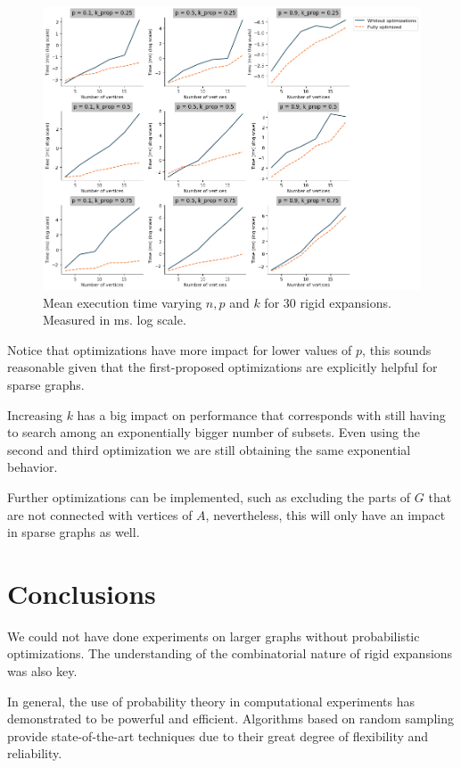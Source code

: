 \begin{figure}[h!]
	\centering
	\includegraphics[scale=0.45]{Python/Figures/Time-execution-rigid-expansions-log-scale.png}
	\caption{Mean execution time varying $n, p$ and $k$ for 30 rigid expansions. Measured in ms. log scale.}
	\label{fig:executionTimesRigidExpansionLog}
\end{figure}

Notice that optimizations have more impact for lower values of $p$, this sounds reasonable given that the first-proposed optimizations are explicitly helpful for sparse graphs. 

Increasing $k$ has a big impact on performance that corresponds with still having to search among an exponentially bigger number of subsets. Even using the second and third optimization we are still obtaining the same exponential behavior.

Further optimizations can be implemented, such as excluding the parts of $G$ that are not connected with vertices of $A$, nevertheless, this will only have an impact in sparse graphs as well.

\section{Conclusions}

We could not have done experiments on larger graphs without probabilistic optimizations. The understanding of the combinatorial nature of rigid expansions was also key.

In general, the use of probability theory in computational experiments has demonstrated to be powerful and efficient. Algorithms based on random sampling provide state-of-the-art techniques due to their great degree of flexibility and reliability. 

